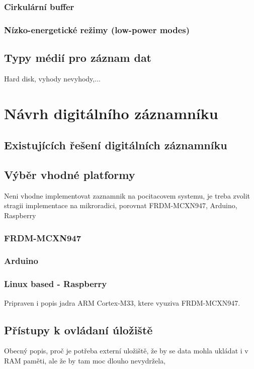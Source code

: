 \subsection{Cirkulární buffer}

\subsection{Nízko-energetické režimy (low-power modes)}

\section{Typy médií pro záznam dat}
Hard disk, vyhody nevyhody,... 

\chapter{Návrh digitálního záznamníku}

\section{Existujících řešení digitálních záznamníku}

\section{Výběr vhodné platformy}
Neni vhodne implementovat zaznamnik na pocitacovem systemu, je treba zvolit stragii implementace na mikroradici, porovnat FRDM-MCXN947, Arduino, Raspberry
\subsection{FRDM-MCXN947}

\subsection{Arduino}

\subsection{Linux based - Raspberry}

Pripraven i popis jadra ARM Cortex-M33, ktere vyuziva FRDM-MCXN947.

\section{Přístupy k ovládaní úložiště}
Obecný popis, proč je potřeba externí uložiště, že by se data mohla ukládat i v RAM paměti, ale že by tam moc dlouho nevydržela, 

